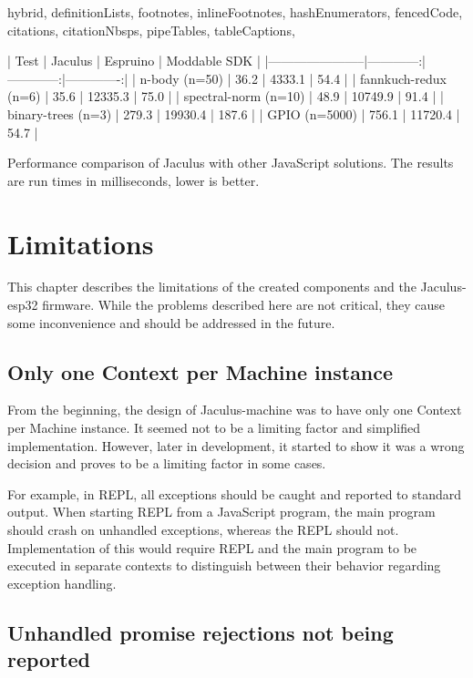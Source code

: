 \begin{markdown*}{%
  hybrid,
  definitionLists,
  footnotes,
  inlineFootnotes,
  hashEnumerators,
  fencedCode,
  citations,
  citationNbsps,
  pipeTables,
  tableCaptions,
}
\begin{table}[ht]
  \centering

  | Test                  | Jaculus     | Espruino    | Moddable SDK |
  |-----------------------|------------:|------------:|-------------:|
  | n-body (n=50)         | 36.2        | 4333.1      | 54.4         |
  | fannkuch-redux (n=6)  | 35.6        | 12335.3     | 75.0         |
  | spectral-norm (n=10)  | 48.9        | 10749.9     | 91.4         |
  | binary-trees (n=3)    | 279.3       | 19930.4     | 187.6        |
  | GPIO (n=5000)         | 756.1       | 11720.4     | 54.7         |

  \caption[Performance comparison of Jaculus with other JavaScript solutions]{Performance comparison of Jaculus with other JavaScript solutions. The results are run times in milliseconds, lower is better.}

  \label{tab:performance}
\end{table}


\chapter{Limitations}

This chapter describes the limitations of the created components and the Jaculus-esp32 firmware. While the problems described here are not critical, they cause some inconvenience and should be addressed in the future.

\section{Only one Context per Machine instance}

From the beginning, the design of Jaculus-machine was to have only one Context per Machine instance. It seemed not to be a limiting factor and simplified implementation. However, later in development, it started to show it was a wrong decision and proves to be a limiting factor in some cases.

For example, in REPL, all exceptions should be caught and reported to standard output. When starting REPL from a JavaScript program, the main program should crash on unhandled exceptions, whereas the REPL should not. Implementation of this would require REPL and the main program to be executed in separate contexts to distinguish between their behavior regarding exception handling.


\section{Unhandled promise rejections not being reported}


\end{markdown*}

